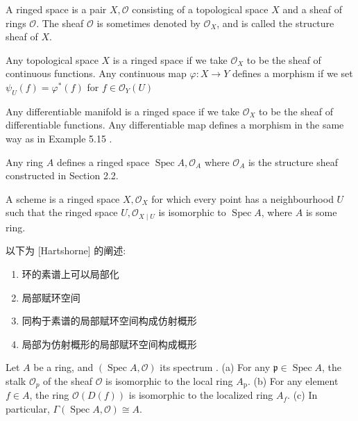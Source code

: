 \begin{definition}[][Definition 5.1]
  A ringed space is a pair $X, \mathcal{O}$ consisting of a topological space $X$ and a sheaf of rings $\mathcal{O}$. The sheaf $\mathcal{O}$ is sometimes denoted by $\mathcal{O}_X$, and is called the structure sheaf of $X$.
\end{definition}

\begin{example}[][Example 5.15]
  Any topological space $X$ is a ringed space if we take $\mathcal{O}_X$ to be the sheaf of continuous functions. Any continuous map $\varphi: X \rightarrow Y$ defines a morphism if we set $\psi_U(f)=\varphi^*(f)$ for $f \in \mathcal{O}_Y(U)$
\end{example}

\begin{example}[][Example 5.16]
  Any differentiable manifold is a ringed space if we take $\mathcal{O}_X$ to be the sheaf of differentiable functions. Any differentiable map defines a morphism in the same way as in Example 5.15 .
\end{example}

\begin{example}[][Example 5.17]
  Any ring $A$ defines a ringed space $\operatorname{Spec} A, \mathcal{O}_A$ where $\mathcal{O}_A$ is the structure sheaf constructed in Section 2.2.
\end{example}

\begin{definition}[][Definition 5.4]
  A scheme is a ringed space $X, \mathcal{O}_X$ for which every point has a neighbourhood $U$ such that the ringed space $U, \mathcal{O}_{X \mid U}$ is isomorphic to $\operatorname{Spec} A$, where $A$ is some ring.
\end{definition}
以下为 [Hartshorne] 的阐述:
\begin{enumerate}
  \item 环的素谱上可以局部化
  \item 局部赋环空间
  \item 同构于素谱的局部赋环空间构成仿射概形
  \item 局部为仿射概形的局部赋环空间构成概形
\end{enumerate}

\begin{proposition}[][Proposition 2.2]
  Let $A$ be a ring, and $(\operatorname{Spec} A, \mathcal{O})$ its spectrum .
(a) For any $\mathfrak{p} \in \operatorname{Spec} A$, the stalk $\mathcal{O}_p$ of the sheaf $\mathcal{O}$ is isomorphic to the local ring $A_{\mathrm{p}}$.
(b) For any element $f \in A$, the ring $\mathcal{O}(D(f))$ is isomorphic to the localized ring $A_f$.
(c) In particular, $\Gamma(\operatorname{Spec} A, \mathcal{O}) \cong A$.
\end{proposition}

